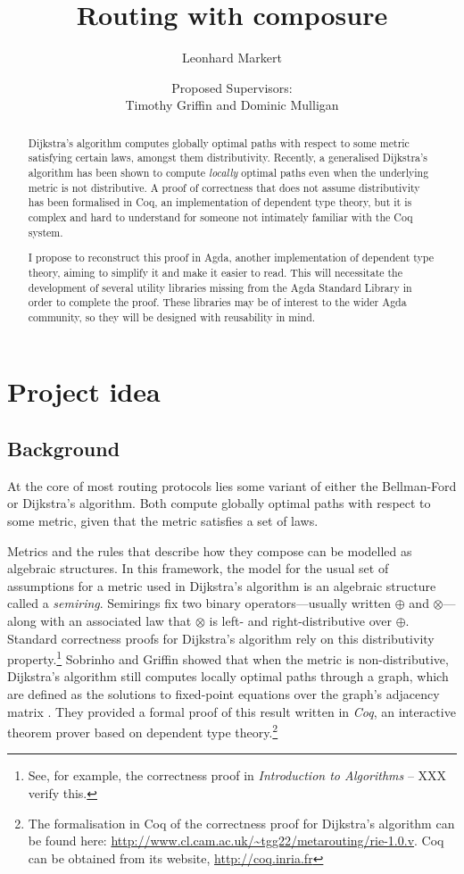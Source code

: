 \documentclass[a4paper]{scrartcl}
\title{Routing with composure}
\author{Leonhard Markert}
\date{Proposed Supervisors:\\Timothy Griffin and Dominic Mulligan}
\begin{document}
\maketitle

\begin{abstract}
Dijkstra's algorithm computes globally optimal paths with respect to some metric satisfying certain laws, amongst them distributivity. Recently, a generalised Dijkstra's algorithm has been shown to compute \emph{locally} optimal paths even when the underlying metric is not distributive. A proof of correctness that does not assume distributivity has been formalised in Coq, an implementation of dependent type theory, but it is complex and hard to understand for someone not intimately familiar with the Coq system.

I propose to reconstruct this proof in Agda, another implementation of dependent type theory, aiming to simplify it and make it easier to read. This will necessitate the development of several utility libraries missing from the Agda Standard Library in order to complete the proof. These libraries may be of interest to the wider Agda community, so they will be designed with reusability in mind.
\end{abstract}

\section{Project idea}
\label{introduction}

\subsection{Background}

At the core of most routing protocols lies some variant of either the Bellman-Ford or Dijkstra's algorithm.
Both compute globally optimal paths with respect to some metric, given that the metric satisfies a set of laws.

Metrics and the rules that describe how they compose can be modelled as algebraic structures.
In this framework, the model for the usual set of assumptions for a metric used in Dijkstra's algorithm is an algebraic structure called a \emph{semiring}.
Semirings fix two binary operators---usually written $\oplus$ and $\otimes$---along with an associated law that $\otimes$ is left- and right-distributive over $\oplus$.
Standard correctness proofs for Dijkstra's algorithm rely on this distributivity property.\footnote{See, for example, the correctness proof in \emph{Introduction to Algorithms} \autocite[XXX]{cormen_introduction_2009} -- XXX verify this.}
Sobrinho and Griffin showed that when the metric is non-distributive, Dijkstra's algorithm still computes locally optimal paths through a graph, which are defined as the solutions to fixed-point equations over the graph's adjacency matrix \autocite{sobrinho_routing_2010}.
They provided a formal proof of this result written in \emph{Coq}, an interactive theorem prover based on dependent type theory.\footnote{The formalisation in Coq of the correctness proof for Dijkstra's algorithm can be found here: \url{http://www.cl.cam.ac.uk/~tgg22/metarouting/rie-1.0.v}.
Coq can be obtained from its website, \url{http://coq.inria.fr}}
\end{document}

